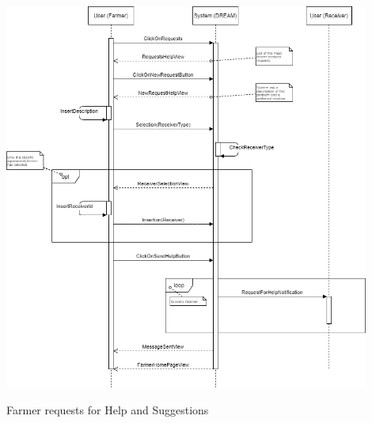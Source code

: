 \documentclass{article}
\begin{document}
\begin{center}
    \includegraphics[width=0.9\textwidth]{images/sequenceDiagrams/6. FarmerRequestHelp.png}
    \par
    \caption{\label{fig:frog}Farmer requests for Help and Suggestions}

    \newpage


    
    
    
   
   
    

\end{center}
\end{document}
